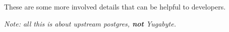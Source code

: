 These are some more involved details that can be helpful to developers.

\emph{Note: all this is about upstream postgres, \textbf{not} Yugabyte.}
